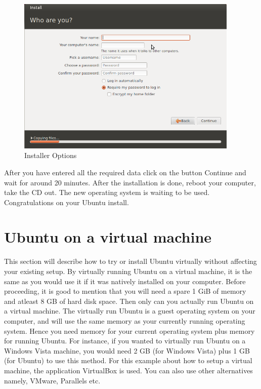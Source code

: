 \begin{figure}[!h]	
	\begin{center}
	\includegraphics[width=300pt]{./images/installation/installer-who.png}
	\caption{Installer Options}	
	\label{fig:installer-who}	
	\end{center}
\end{figure}

\par \noindent After you have entered all the required data click on the button Continue and wait for around 20 minutes. After the installation is done, reboot your computer, take the CD out. The new operating system is waiting to be used. Congratulations on your Ubuntu install.


\newpage
\section{Ubuntu on a virtual machine}
This section will describe how to try or install Ubuntu virtually without affecting your existing setup. By virtually running Ubuntu on a virtual machine, it is the same as you would use it if it was natively installed on your computer. Before proceeding, it is good to mention that you will need a spare 1 GiB of memory and atleast 8 GB of hard disk space. Then only can you actually run Ubuntu on a virtual machine. The virtually run Ubuntu is a guest operating system on your computer, and will use the same memory as your currently running operating system.  Hence you need memory for your current operating system plus memory for running Ubuntu. For instance, if you wanted to virtually run Ubuntu on a Windows Vista machine, you would need 2 GB (for Windows Vista) plus 1 GB (for Ubuntu) to use this method. For this example about how to setup a virtual machine, the application VirtualBox is used. You can  also use other alternatives namely, VMware, Parallels etc.  \\


